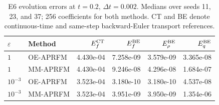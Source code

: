\begin{table}[t]
\centering
\caption{E6 evolution errors at $t=0.2$, $\Delta t=0.002$. Medians over seeds 11, 23, and 37; 256 coefficients for both methods. CT and BE denote continuous-time and same-step backward-Euler transport references.}
\label{tab:e6-mm}
\begin{tabular}{llrrrr}
\toprule
$\varepsilon$ & Method & $E_f^{\rm CT}$ & $E_f^{\rm BE}$ & $E_\rho^{\rm BE}$ & $E_q^{\rm BE}$ \\
\midrule
$1$ & OE-APRFM & 4.430e-04 & 7.258e-09 & 3.579e-09 & 3.365e-08 \\
$1$ & MM-APRFM & 4.430e-04 & 9.246e-08 & 4.296e-08 & 1.684e-07 \\
\midrule
$10^{-3}$ & OE-APRFM & 3.523e-04 & 3.180e-10 & 3.180e-10 & 4.537e-08 \\
$10^{-3}$ & MM-APRFM & 3.523e-04 & 3.951e-09 & 3.950e-09 & 1.354e-06 \\
\bottomrule
\end{tabular}
\end{table}
